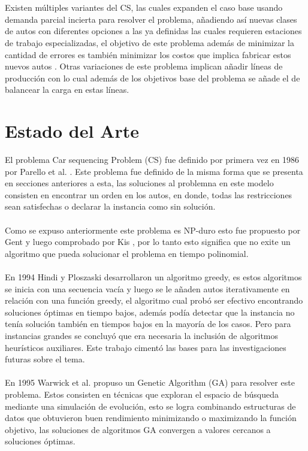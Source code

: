 \documentclass[letter, 10pt]{article}
\begin{document}
\\\\ 
Existen m\'ultiples variantes del CS, las cuales expanden el caso base usando demanda parcial incierta para resolver el problema, a\~{n}adiendo as\'i nuevas clases de autos con diferentes opciones a las ya definidas las cuales requieren estaciones de trabajo especializadas, el objetivo de este problema adem\'as de minimizar la cantidad de errores es tambi\'en minimizar los costos que implica fabricar estos nuevos autos \cite{ESP}. Otras variaciones de este problema implican a\~{n}adir l\'ineas de producci\'on con lo cual adem\'as de los objetivos base del problema se a\~{n}ade el de balancear la carga en estas l\'ineas.
\section{Estado del Arte}
El problema Car sequencing Problem (CS) fue definido por primera vez en 1986 por Parello et al. \cite{Parrello}. Este problema fue definido de la misma forma que se presenta en secciones anteriores a esta, las soluciones al problemna en este modelo consisten en encontrar un orden en los autos, en donde, todas las restricciones sean satisfechas o declarar la instancia como sin soluci\'on.\\\\
Como se expuso anteriormente este problema es NP-duro esto fue propuesto por Gent \cite{Gent99} y luego comprobado por Kis \cite{Tamas}, por lo tanto esto significa que no exite un algoritmo que pueda solucionar el problema en tiempo polinomial.\\\\
En 1994 Hindi y Ploszaski  \cite{Hindi} desarrollaron un algoritmo greedy, es estos algoritmos se inicia con una secuencia vac\'ia y luego se le a\~{n}aden autos iterativamente en relaci\'on con una funci\'on greedy, el algoritmo cual prob\'o ser efectivo encontrando soluciones \'optimas en tiempo bajos, adem\'as pod\'ia detectar que la instancia no ten\'ia soluci\'on tambi\'en en tiempos bajos en la mayor\'ia de los casos. Pero para instancias grandes se concluy\'o que era necesaria la inclusi\'on de algoritmos heur\'isticos auxiliares. Este trabajo ciment\'o las bases para las investigaciones futuras sobre el tema. 
\\\\
En 1995 Warwick et al.\cite{Warwick} propuso un Genetic Algorithm (GA) para resolver este problema. Estos consisten en t\'ecnicas que exploran el espacio de b\'usqueda mediante una simulaci\'on de evoluci\'on, esto se logra combinando estructuras de datos que obtuvieron buen rendimiento minimizando o maximizando la funci\'on objetivo, las soluciones de algoritmos GA convergen a valores cercanos a soluciones \'optimas. \\\\
\end{document}
